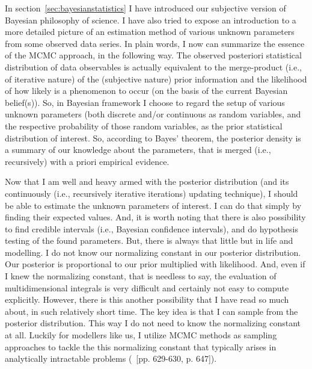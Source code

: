 \documentclass[a4paper,11pt,english]{article}
\begin{document}
		In section~\ref{sec:bayesianstatistics} I have introduced our subjective version of  Bayesian philosophy of science. I have also tried to expose 
		an introduction to a more detailed picture of an estimation method of various unknown parameters from some observed data series. In plain words, 	 	    I now can summarize the essence of the MCMC approach, in the following way. The observed posteriori statistical distribution of data observables
		is  actually equivalent to the merge-product (i.e., of iterative nature) of the (subjective nature) prior information and the likelihood of how 
		likely is a phenomenon to occur (on the basis of the current Bayesian belief(s)). So, in Bayesian framework I choose to regard the setup of 
		various unknown parameters (both discrete and/or continuous as random variables, and the respective probability of those random variables, as the 
		prior statistical distribution of interest. So, according to Bayes' theorem, the posterior density is a summary of our knowledge about the 
		parameters, that is merged (i.e., recursively) with a priori empirical evidence. 
		
		Now that I am well and heavy armed with the posterior distribution (and its continuously (i.e., recursively iterative iterations) updating 
		technique), I should be able to estimate the unknown parameters of interest. I can do that simply by finding their expected values. And, it is 
		worth noting that there is also possibility to find credible intervals (i.e., Bayesian confidence intervals), and do hypothesis testing of the 
		found parameters. But, there is always that little but in life and modelling. I do not know our normalizing constant in our posterior distribution. 
	    Our posterior is proportional to our prior multiplied with likelihood. And, even if I knew the normalizing constant, that is needless to say, the 
	    evaluation of multidimensional integrals is very difficult and certainly not easy to compute explicitly. However, there is this another possibility
	    that I have read so much about, in such relatively short time. The key idea is that I can sample from the posterior distribution. This way I
	    do not need to know the normalizing constant at all. Luckily for modellers like us, I utilize MCMC methods as sampling approaches to tackle the 
	    this normalizing constant that typically arises in analytically intractable problems (~\citep{brandimarte}[pp. 629-630, p. 647]).	
\end{document}
